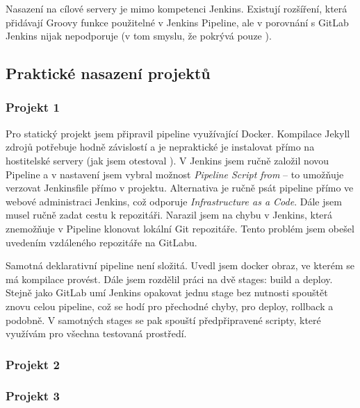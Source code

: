         Nasazení na cílové servery je mimo kompetenci Jenkins. Existují rozšíření, která přidávají Groovy funkce použitelné v Jenkins Pipeline, ale v porovnání s GitLab Jenkins nijak \CD nepodporuje (v tom smyslu, že pokrývá pouze \CI).

    \subsection{Praktické nasazení projektů}
        \subsubsection{Projekt 1}
            Pro statický projekt jsem připravil pipeline využívající Docker. Kompilace Jekyll zdrojů potřebuje hodně závislostí a je nepraktické je instalovat přímo na hostitelské servery (jak jsem otestoval ). V Jenkins jsem ručně založil novou Pipeline a v nastavení jsem vybral možnost \textit{Pipeline Script from } -- to umožňuje verzovat Jenkinsfile přímo v projektu. Alternativa je ručně psát pipeline přímo ve webové administraci Jenkins, což odporuje \textit{Infrastructure as a Code}. Dále jsem musel ručně zadat cestu k repozitáři. Narazil jsem na chybu v Jenkins, která znemožňuje v Pipeline klonovat lokální Git repozitáře. Tento problém jsem obešel uvedením vzdáleného repozitáře na GitLabu.

            Samotná deklarativní pipeline není složitá. Uvedl jsem docker obraz, ve kterém se má kompilace provést. Dále jsem rozdělil práci na dvě stages: build a deploy. Stejně jako GitLab umí Jenkins opakovat jednu stage bez nutnosti spouštět znovu celou pipeline, což se hodí pro přechodné chyby, pro deploy, rollback a podobně. V samotných stages se pak spouští předpřipravené scripty, které využívám pro všechna testovaná \CICD prostředí.

        \subsubsection{Projekt 2}
            \blind[2]


        \subsubsection{Projekt 3}
            \blind[2]
